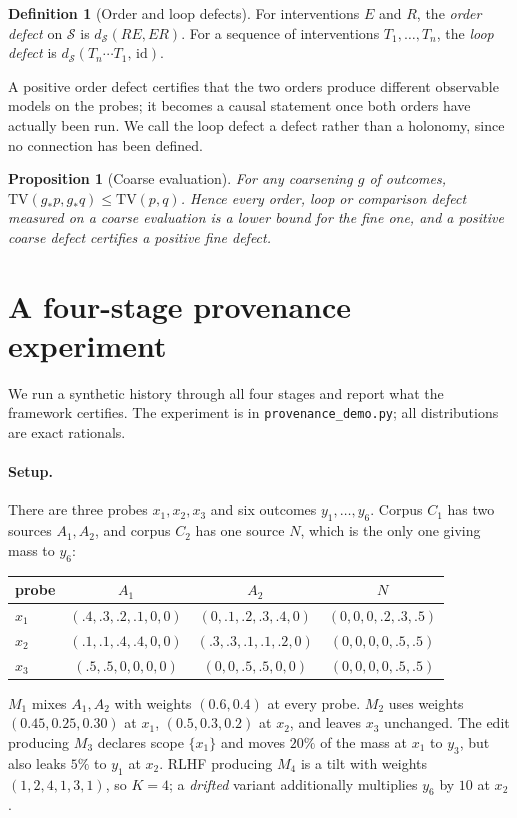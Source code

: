 \documentclass[11pt]{article}
\newtheorem{proposition}[theorem]{Proposition}
\theoremstyle{definition}
\newtheorem{definition}[theorem]{Definition}
\theoremstyle{remark}
\newcommand{\TV}{\mathrm{TV}}
\newcommand{\cS}{\mathcal{S}}
\begin{document}
\begin{definition}[Order and loop defects]
For interventions $E$ and $R$, the \emph{order defect} on $\cS$ is $d_\cS(RE,ER)$. For a sequence
of interventions $T_1,\dots,T_n$, the \emph{loop defect} is $d_\cS(T_n\cdots T_1,\,\mathrm{id})$.
\end{definition}

A positive order defect certifies that the two orders produce different observable models on the
probes; it becomes a causal statement once both orders have actually been run. We call the loop defect
a defect rather than a holonomy, since no connection has been defined.

\begin{proposition}[Coarse evaluation]\label{prop:coarse}
For any coarsening $g$ of outcomes, $\TV(g_*p,g_*q)\le\TV(p,q)$. Hence every order, loop or comparison
defect measured on a coarse evaluation is a lower bound for the fine one, and a positive coarse defect
certifies a positive fine defect.
\end{proposition}

\section{A four-stage provenance experiment}\label{sec:demo}

We run a synthetic history through all four stages and report what the framework certifies. The
experiment is in \texttt{provenance\_demo.py}; all distributions are exact rationals.

\paragraph{Setup.} There are three probes $x_1,x_2,x_3$ and six outcomes $y_1,\dots,y_6$. Corpus $C_1$
has two sources $A_1,A_2$, and corpus $C_2$ has one source $N$, which is the only one giving mass to
$y_6$:
\begin{center}\small
\begin{tabular}{@{}lccc@{}}
\toprule
probe & $A_1$ & $A_2$ & $N$\\
\midrule
$x_1$ & $(.4,.3,.2,.1,0,0)$ & $(0,.1,.2,.3,.4,0)$ & $(0,0,0,.2,.3,.5)$\\
$x_2$ & $(.1,.1,.4,.4,0,0)$ & $(.3,.3,.1,.1,.2,0)$ & $(0,0,0,0,.5,.5)$\\
$x_3$ & $(.5,.5,0,0,0,0)$ & $(0,0,.5,.5,0,0)$ & $(0,0,0,0,.5,.5)$\\
\bottomrule
\end{tabular}
\end{center}
$M_1$ mixes $A_1,A_2$ with weights $(0.6,0.4)$ at every probe. $M_2$ uses weights $(0.45,0.25,0.30)$ at
$x_1$, $(0.5,0.3,0.2)$ at $x_2$, and leaves $x_3$ unchanged. The edit producing $M_3$ declares scope
$\{x_1\}$ and moves $20\%$ of the mass at $x_1$ to $y_3$, but also leaks $5\%$ to $y_1$ at $x_2$. RLHF
producing $M_4$ is a tilt with weights $(1,2,4,1,3,1)$, so $K=4$; a \emph{drifted} variant additionally
multiplies $y_6$ by $10$ at $x_2$.
\end{document}
